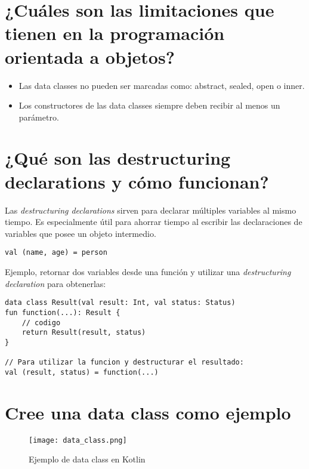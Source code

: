 \documentclass[11pt]{scrartcl} %
\begin{document}
\section{¿Cuáles son las limitaciones que tienen en la programación orientada a objetos?}

\begin{itemize}
	\item Las data classes no pueden ser marcadas como: abstract, sealed, open o inner.
	\item Los constructores de las data classes siempre deben recibir al menos un parámetro.
\end{itemize}

\section{¿Qué son las destructuring declarations y cómo funcionan?}

Las \emph{destructuring declarations} sirven para declarar múltiples variables al mismo tiempo. Es especialmente útil para ahorrar tiempo al escribir las declaraciones de variables que posee un objeto intermedio.

\begin{lstlisting}
val (name, age) = person
\end{lstlisting}

Ejemplo, retornar dos variables desde una función y utilizar una \emph{destructuring declaration} para obtenerlas:

\begin{lstlisting}
data class Result(val result: Int, val status: Status)
fun function(...): Result {
    // codigo
    return Result(result, status)
}

// Para utilizar la funcion y destructurar el resultado:
val (result, status) = function(...)
\end{lstlisting}

\section{Cree una data class como ejemplo}

\begin{figure}[h] %
	\centering
	\texttt{[image: data\_class.png]} %
	\caption{Ejemplo de data class en Kotlin}
\end{figure}
\end{document}
